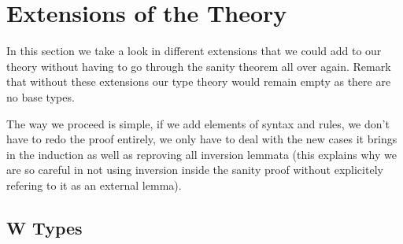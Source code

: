 \section{Extensions of the Theory}
\label{sec:extensions}

In this section we take a look in different extensions that we could add to
our theory without having to go through the sanity theorem all over again.
Remark that without these extensions our type theory would remain empty as there
are no base types.

The way we proceed is simple, if we add elements of syntax and rules, we don't
have to redo the proof entirely, we only have to deal with the new cases it
brings in the induction as well as reproving all inversion lemmata
(this explains why we are so careful in not using inversion inside the sanity
proof without explicitely refering to it as an external lemma).






\subsection{W Types}
